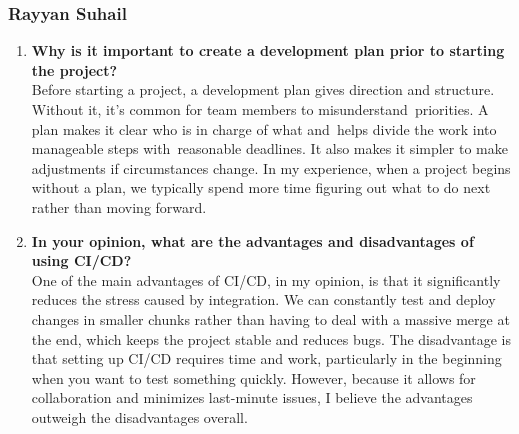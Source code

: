 \documentclass{article}
\begin{document}
\subsubsection*{Rayyan Suhail}
\begin{enumerate}
    \item \textbf{Why is it important to create a development plan prior to starting the
    project?}\\

    Before starting a project, a development plan gives direction and structure. Without it, it's common for team members to misunderstand priorities. A plan makes it clear who is in charge of what and helps divide the work into manageable steps with reasonable deadlines. It also makes it simpler to make adjustments if circumstances change. In my experience, when a project begins without a plan, we typically spend more time figuring out what to do next rather than moving forward.

    \item \textbf{In your opinion, what are the advantages and disadvantages of using
    CI/CD?}\\

    One of the main advantages of CI/CD, in my opinion, is that it significantly reduces the stress caused by integration. We can constantly test and deploy changes in smaller chunks rather than having to deal with a massive merge at the end, which keeps the project stable and reduces bugs. The disadvantage is that setting up CI/CD requires time and work, particularly in the beginning when you want to test something quickly. However, because it allows for collaboration and minimizes last-minute issues, I believe the advantages outweigh the disadvantages overall.
\end{enumerate}
\end{document}
